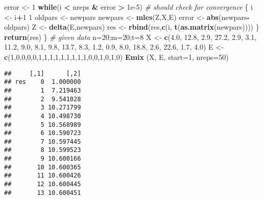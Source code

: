 \documentclass[]{article}
\newenvironment{Shaded}{\begin{snugshade}}{\end{snugshade}}
\newcommand{\CommentTok}[1]{\textcolor[rgb]{0.56,0.35,0.01}{\textit{#1}}}
\newcommand{\ControlFlowTok}[1]{\textcolor[rgb]{0.13,0.29,0.53}{\textbf{#1}}}
\newcommand{\DataTypeTok}[1]{\textcolor[rgb]{0.13,0.29,0.53}{#1}}
\newcommand{\DecValTok}[1]{\textcolor[rgb]{0.00,0.00,0.81}{#1}}
\newcommand{\FloatTok}[1]{\textcolor[rgb]{0.00,0.00,0.81}{#1}}
\newcommand{\KeywordTok}[1]{\textcolor[rgb]{0.13,0.29,0.53}{\textbf{#1}}}
\newcommand{\NormalTok}[1]{#1}
\newcommand{\OperatorTok}[1]{\textcolor[rgb]{0.81,0.36,0.00}{\textbf{#1}}}
\newcommand{\StringTok}[1]{\textcolor[rgb]{0.31,0.60,0.02}{#1}}
\begin{document}
\begin{Shaded}
\begin{Highlighting}[]
\NormalTok{  error <-}\StringTok{ }\DecValTok{1}
  \ControlFlowTok{while}\NormalTok{(i }\OperatorTok{<}\StringTok{ }\NormalTok{nreps }\OperatorTok{&}\StringTok{ }\NormalTok{error }\OperatorTok{>}\StringTok{ }\FloatTok{1e-5}\NormalTok{) }\CommentTok{# should check for convergence}
\NormalTok{  \{}
\NormalTok{i <-}\StringTok{ }\NormalTok{i}\OperatorTok{+}\DecValTok{1}
\DecValTok{1}
\NormalTok{oldpars <-}\StringTok{ }\NormalTok{newpars}
\NormalTok{    newpars <-}\StringTok{ }\KeywordTok{mles}\NormalTok{(Z,X,E)}
\NormalTok{    error <-}\StringTok{ }\KeywordTok{abs}\NormalTok{(newpars}\OperatorTok{-}\NormalTok{oldpars)}
\NormalTok{    Z <-}\StringTok{ }\KeywordTok{delta}\NormalTok{(E,newpars)}
\NormalTok{    res <-}\StringTok{ }\KeywordTok{rbind}\NormalTok{(res,}\KeywordTok{c}\NormalTok{(i, }\KeywordTok{t}\NormalTok{(}\KeywordTok{as.matrix}\NormalTok{(newpars))))}
\NormalTok{\}}
  \KeywordTok{return}\NormalTok{(res)}
\NormalTok{\}}
\CommentTok{# given data}
\NormalTok{n=}\DecValTok{20}\NormalTok{;m=}\DecValTok{20}\NormalTok{;t=}\DecValTok{8}
\NormalTok{X <-}\StringTok{ }\KeywordTok{c}\NormalTok{(}\FloatTok{4.0}\NormalTok{, }\FloatTok{12.8}\NormalTok{, }\FloatTok{2.9}\NormalTok{, }\FloatTok{27.2}\NormalTok{, }\FloatTok{2.9}\NormalTok{, }\FloatTok{3.1}\NormalTok{, }\FloatTok{11.2}\NormalTok{, }\FloatTok{9.0}\NormalTok{, }\FloatTok{8.1}\NormalTok{, }\FloatTok{9.8}\NormalTok{, }\FloatTok{13.7}\NormalTok{, }\FloatTok{8.3}\NormalTok{, }\FloatTok{1.2}\NormalTok{, }\FloatTok{0.9}\NormalTok{, }\FloatTok{8.0}\NormalTok{, }\FloatTok{18.8}\NormalTok{, }\FloatTok{2.6}\NormalTok{, }\FloatTok{22.6}\NormalTok{, }\FloatTok{1.7}\NormalTok{, }\FloatTok{4.0}\NormalTok{)}
\NormalTok{E <-}\StringTok{ }\KeywordTok{c}\NormalTok{(}\DecValTok{1}\NormalTok{,}\DecValTok{0}\NormalTok{,}\DecValTok{0}\NormalTok{,}\DecValTok{0}\NormalTok{,}\DecValTok{0}\NormalTok{,}\DecValTok{1}\NormalTok{,}\DecValTok{1}\NormalTok{,}\DecValTok{1}\NormalTok{,}\DecValTok{1}\NormalTok{,}\DecValTok{1}\NormalTok{,}\DecValTok{1}\NormalTok{,}\DecValTok{1}\NormalTok{,}\DecValTok{1}\NormalTok{,}\DecValTok{1}\NormalTok{,}\DecValTok{0}\NormalTok{,}\DecValTok{0}\NormalTok{,}\DecValTok{1}\NormalTok{,}\DecValTok{0}\NormalTok{,}\DecValTok{1}\NormalTok{,}\DecValTok{0}\NormalTok{)}
\KeywordTok{Emix}\NormalTok{ (X, E, }\DataTypeTok{start=}\DecValTok{1}\NormalTok{, }\DataTypeTok{nreps=}\DecValTok{50}\NormalTok{)}
\end{Highlighting}
\end{Shaded}

\begin{verbatim}
##     [,1]      [,2]
## res    0  1.000000
##        1  7.219463
##        2  9.541028
##        3 10.271799
##        4 10.498730
##        5 10.568989
##        6 10.590723
##        7 10.597445
##        8 10.599523
##        9 10.600166
##       10 10.600365
##       11 10.600426
##       12 10.600445
##       13 10.600451
\end{verbatim}
\end{document}
